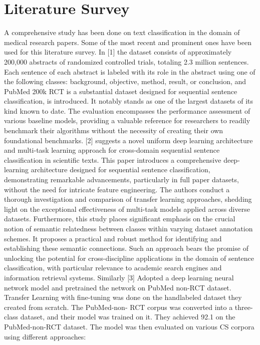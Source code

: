 \documentclass[conference]{IEEEtran}
\begin{document}
\section{Literature Survey}
A comprehensive study has been done on text classification
in the domain of medical research papers. Some of the most
recent and prominent ones have been used for this literature
survey.
In [1] the dataset consists of approximately 200,000 abstracts
of randomized controlled trials, totaling 2.3 million
sentences. Each sentence of each abstract is labeled with its
role in the abstract using one of the following classes: background,
objective, method, result, or conclusion, and PubMed
200k RCT is a substantial dataset designed for sequential
sentence classification, is introduced. It notably stands as
one of the largest datasets of its kind known to date. The
evaluation encompasses the performance assessment of various
baseline models, providing a valuable reference for researchers
to readily benchmark their algorithms without the necessity of
creating their own foundational benchmarks.
[2] suggests a novel uniform deep learning architecture
and multi-task learning approach for cross-domain sequential
sentence classification in scientific texts. This paper introduces
a comprehensive deep-learning architecture designed for
sequential sentence classification, demonstrating remarkable
advancements, particularly in full paper datasets, without the
need for intricate feature engineering. The authors conduct
a thorough investigation and comparison of transfer learning
approaches, shedding light on the exceptional effectiveness
of multi-task models applied across diverse datasets. Furthermore,
this study places significant emphasis on the crucial
notion of semantic relatedness between classes within varying
dataset annotation schemes. It proposes a practical and robust
method for identifying and establishing these semantic connections.
Such an approach bears the promise of unlocking
the potential for cross-discipline applications in the domain of
sentence classification, with particular relevance to academic
search engines and information retrieval systems.
Similarly [3] Adopted a deep learning neural network model
and pretrained the network on PubMed non-RCT dataset.
Transfer Learning with fine-tuning was done on the handlabeled
dataset they created from scratch. The PubMed-non-
RCT corpus was converted into a three-class dataset, and
their model was trained on it. They achieved 92.1%
on the PubMed-non-RCT dataset. The model was then
evaluated on various CS corpora using different approaches:
\end{document}
